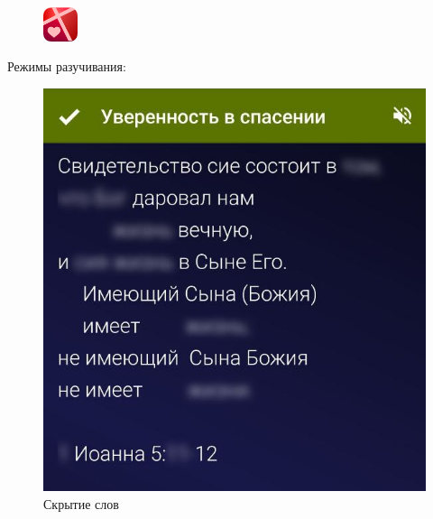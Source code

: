 \documentclass[t,aspectratio=169]{beamer}  %
\begin{document}
\begin{frame}[c]
	\frametitle{\insertsection}
	\framesubtitle{\insertsubsection}
	\begin{figure}
		\begin{flushright}
		\vspace{-1.5cm}
		\includegraphics[width=1cm]{remember-me-logo}
	\end{flushright}
		\end{figure}
		\vspace{0.4cm}
	Режимы разучивания:
	 \begin{multicols}{2}
		\begin{center}
			\begin{figure}
			\includegraphics[height=0.55\textheight]{remember-me-card-hide}
			\caption{Скрытие слов}
			\end{figure}
			\begin{figure}

\end{figure}
\end{center}
\end{multicols}
\end{frame}
\end{document}
